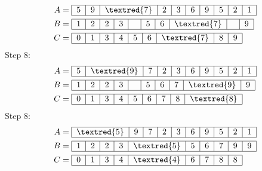 {\begin{align*}
A &= 
\begin{tabular}{|c|c|c|c|c|c|c|c|c|c|}
    \hline
    5 & 9 & \textred{7} & 2 & 3 & 6 & 9 & 5 & 2 & 1 \\
    \hline
\end{tabular}\\
    B &= 
\begin{tabular}{|c|c|c|c|c|c|c|c|c|c|}
    \hline
    1 & 2 & 2 & 3 & ~ & 5 & 6 & \textred{7} & ~ & 9 \\
    \hline
\end{tabular}\\
    C &= 
\begin{tabular}{|c|c|c|c|c|c|c|c|c|}
    \hline
    0 & 1 & 3 & 4 & 5 & 6 & \textred{7} & 8 & 9 \\
    \hline
\end{tabular}
\end{align*}
Step 8:
\begin{align*}
A &= 
\begin{tabular}{|c|c|c|c|c|c|c|c|c|c|}
    \hline
    5 & \textred{9} & 7 & 2 & 3 & 6 & 9 & 5 & 2 & 1 \\
    \hline
\end{tabular}\\
    B &= 
\begin{tabular}{|c|c|c|c|c|c|c|c|c|c|}
    \hline
    1 & 2 & 2 & 3 & ~ & 5 & 6 & 7 & \textred{9} & 9 \\
    \hline
\end{tabular}\\
    C &= 
\begin{tabular}{|c|c|c|c|c|c|c|c|c|}
    \hline
    0 & 1 & 3 & 4 & 5 & 6 & 7 & 8 & \textred{8} \\
    \hline
\end{tabular}
\end{align*}
Step 8:
\begin{align*}
A &= 
\begin{tabular}{|c|c|c|c|c|c|c|c|c|c|}
    \hline
    \textred{5} & 9 & 7 & 2 & 3 & 6 & 9 & 5 & 2 & 1 \\
    \hline
\end{tabular}\\
    B &= 
\begin{tabular}{|c|c|c|c|c|c|c|c|c|c|}
    \hline
    1 & 2 & 2 & 3 & \textred{5} & 5 & 6 & 7 & 9 & 9 \\
    \hline
\end{tabular}\\
    C &= 
\begin{tabular}{|c|c|c|c|c|c|c|c|c|}
    \hline
    0 & 1 & 3 & 4 & \textred{4} & 6 & 7 & 8 & 8 \\
    \hline
\end{tabular}
\end{align*}
}